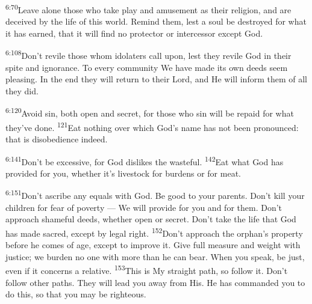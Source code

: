 \documentclass[openany,12pt,english]{book}
\newenvironment{para}{\par\pretolerance=100\tolerance=200\setlength{\emergencystretch}{0.6em}\relax}{\par}
\begin{document}
\begin{para}
    \textsuperscript{6:70}\thinspace{}Leave a\-lone those who take play and a\-muse\-ment as their re\-li\-gion, and are de\-ceived by the life of this world. Re\-mind them, lest a soul be destroyed for what it has earned, that it will find no pro\-tec\-tor or in\-ter\-ces\-sor ex\-cept God.
\end{para}

\begin{para}
    \textsuperscript{6:108}\thinspace{}Don't re\-vile those whom idolaters call up\-on, lest they re\-vile God in their spite and ig\-no\-rance. To eve\-ry com\-mu\-ni\-ty We have made its own deeds seem pleas\-ing. In the end they will re\-turn to their Lord, and He will in\-form them of all they did.
\end{para}

\begin{para}
    \textsuperscript{6:120}\thinspace{}A\-void sin, both o\-pen and se\-cret, for those who sin will be repaid for what they've done.
    \textsuperscript{121}\thinspace{}Eat noth\-ing o\-ver which God's name has not been pro\-nounced: that is dis\-o\-be\-di\-ence in\-deed.
\end{para}

\begin{para}
    \textsuperscript{6:141}\thinspace{}Don't be ex\-ces\-sive, for God dislikes the waste\-ful.
    \textsuperscript{142}\thinspace{}Eat what God has pro\-vid\-ed for you, wheth\-er it's live\-stock for burdens or for meat.
\end{para}

\begin{para}
    \textsuperscript{6:151}\thinspace{}Don't as\-cribe any equals with God. Be good to your parents. Don't kill your chil\-dren for fear of pov\-er\-ty --- We will pro\-vide for you and for them. Don't ap\-proach shame\-ful deeds, wheth\-er o\-pen or se\-cret. Don't take the life that God has made sa\-cred, ex\-cept by le\-gal right.
    \textsuperscript{152}\thinspace{}Don't ap\-proach the orphan's prop\-er\-ty be\-fore he co\-mes of age, ex\-cept to im\-prove it. Give full meas\-ure and weight with jus\-tice; we bur\-den no one with more than he can bear. When you speak, be just, e\-ven if it concerns a rel\-a\-tive.
    \textsuperscript{153}\thinspace{}This is My straight path, so fol\-low it. Don't fol\-low oth\-er paths. They will lead you a\-way from His. He has commanded you to do this, so that you may be right\-eous.
\end{para}
\end{document}
